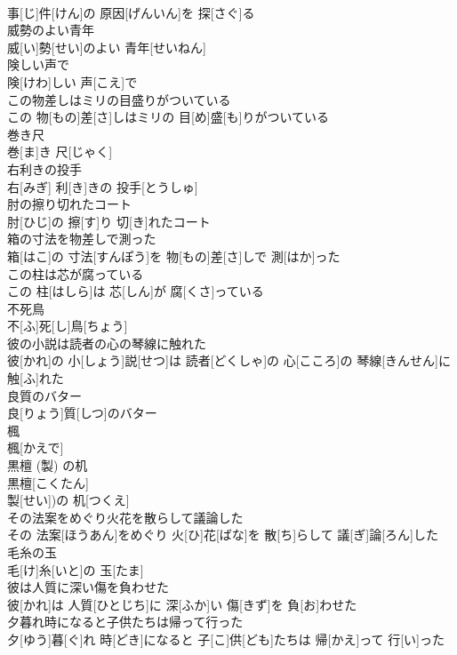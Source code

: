 \documentclass[8pt]{extreport}
\begin{document}
\begin{CJK}{UTF8}{min}
\\	事[じ]件[けん]の 原因[げんいん]を 探[さぐ]る
\\	威勢のよい青年	
\\	威[い]勢[せい]のよい 青年[せいねん]
\\	険しい声で	
\\	険[けわ]しい 声[こえ]で
\\	この物差しはミリの目盛りがついている	
\\	この 物[もの]差[さ]しはミリの 目[め]盛[も]りがついている
\\	巻き尺	
\\	巻[ま]き 尺[じゃく]
\\	右利きの投手	
\\	右[みぎ] 利[き]きの 投手[とうしゅ]
\\	肘の擦り切れたコート	
\\	肘[ひじ]の 擦[す]り 切[き]れたコート
\\	箱の寸法を物差しで測った	
\\	箱[はこ]の 寸法[すんぽう]を 物[もの]差[さ]しで 測[はか]った
\\	この柱は芯が腐っている	
\\	この 柱[はしら]は 芯[しん]が 腐[くさ]っている
\\	不死鳥	
\\	不[ふ]死[し]鳥[ちょう]
\\	彼の小説は読者の心の琴線に触れた	
\\	彼[かれ]の 小[しょう]説[せつ]は 読者[どくしゃ]の 心[こころ]の 琴線[きんせん]に 触[ふ]れた
\\	良質のバター	
\\	良[りょう]質[しつ]のバター
\\	楓	
\\	楓[かえで]
\\	黒檀 (製) の机	
\\	黒檀[こくたん]
\\	製[せい])の 机[つくえ]
\\	その法案をめぐり火花を散らして議論した	
\\	その 法案[ほうあん]をめぐり 火[ひ]花[ばな]を 散[ち]らして 議[ぎ]論[ろん]した
\\	毛糸の玉	
\\	毛[け]糸[いと]の 玉[たま]
\\	彼は人質に深い傷を負わせた	
\\	彼[かれ]は 人質[ひとじち]に 深[ふか]い 傷[きず]を 負[お]わせた
\\	夕暮れ時になると子供たちは帰って行った	
\\	夕[ゆう]暮[ぐ]れ 時[どき]になると 子[こ]供[ども]たちは 帰[かえ]って 行[い]った

\end{CJK}
\end{document}
